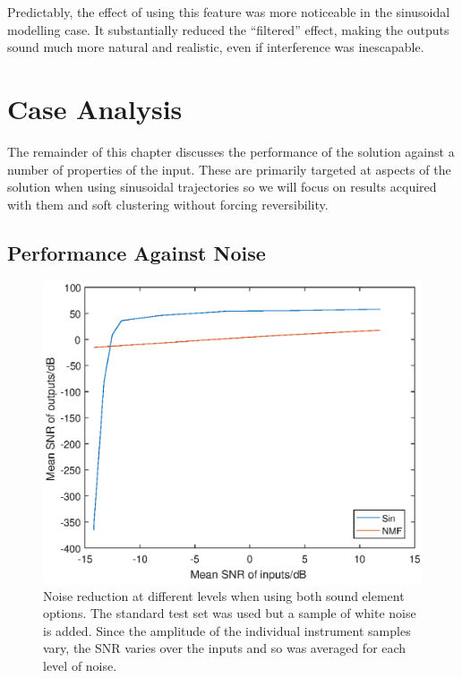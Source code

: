 \documentclass[12pt,a4paper,twoside,openright]{report}
\begin{document}
Predictably, the effect of using this feature was more noticeable in the sinusoidal modelling case. It substantially reduced the ``filtered'' effect, making the outputs sound much more natural and realistic, even if interference was inescapable.

\section{Case Analysis}


The remainder of this chapter discusses the performance of the solution against a number of properties of the input. These are primarily targeted at aspects of the solution when using sinusoidal trajectories so we will focus on results acquired with them and soft clustering without forcing reversibility.

\subsection{Performance Against Noise}




\begin{figure}
\centering
\includegraphics[width=0.7\linewidth]{./NoisePlot}
\caption[Noise reduction at different levels when using both sound element options.]{Noise reduction at different levels when using both sound element options. The standard test set was used but a sample of white noise is added. Since the amplitude of the individual instrument samples vary, the SNR varies over the inputs and so was averaged for each level of noise.}
\label{fig:NoisePlot}
\end{figure}
\end{document}
